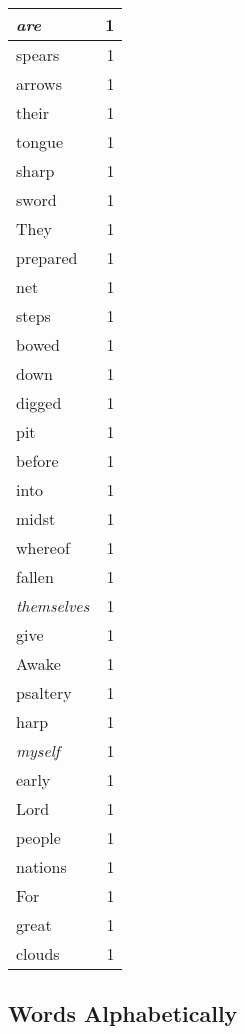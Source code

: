 \begin{center}
\begin{longtable}{l|r}
\emph{are} & 1 \\ \hline
spears & 1 \\ \hline
arrows & 1 \\ \hline
their & 1 \\ \hline
tongue & 1 \\ \hline
sharp & 1 \\ \hline
sword & 1 \\ \hline
They & 1 \\ \hline
prepared & 1 \\ \hline
net & 1 \\ \hline
steps & 1 \\ \hline
bowed & 1 \\ \hline
down & 1 \\ \hline
digged & 1 \\ \hline
pit & 1 \\ \hline
before & 1 \\ \hline
into & 1 \\ \hline
midst & 1 \\ \hline
whereof & 1 \\ \hline
fallen & 1 \\ \hline
\emph{themselves} & 1 \\ \hline
give & 1 \\ \hline
Awake & 1 \\ \hline
psaltery & 1 \\ \hline
harp & 1 \\ \hline
\emph{myself} & 1 \\ \hline
early & 1 \\ \hline
Lord & 1 \\ \hline
people & 1 \\ \hline
nations & 1 \\ \hline
For & 1 \\ \hline
great & 1 \\ \hline
clouds & 1 \\ \hline
\end{longtable}
\end{center}



\normalsize



\subsection{Words Alphabetically}

